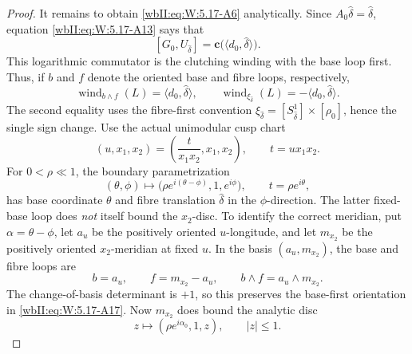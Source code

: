 \begin{proof}
It remains to obtain \eqref{wbII:eq:W:5.17-A6} analytically.  Since
\(A_0\widehat\delta=\widehat\delta\), equation \eqref{wbII:eq:W:5.17-A13} says that
\[
 [G_0,U_{\widehat\delta}]
 =\mathbf c\bigl(\langle d_0,\widehat\delta\rangle\bigr).
\tag{W.113}\label{wbII:eq:W:5.17-A16}
\]
This logarithmic commutator is the clutching winding with the base loop
first.  Thus, if \(b\) and \(f\) denote the oriented base and fibre loops,
respectively,
\[
 \operatorname{wind}_{b\wedge f}(L)
  =\langle d_0,\widehat\delta\rangle,
 \qquad
 \operatorname{wind}_{\xi_{\widehat\delta}}(L)
 =-\langle d_0,\widehat\delta\rangle.
\tag{W.114}\label{wbII:eq:W:5.17-A17}
\]
The second equality uses the fibre-first convention
\(\xi_{\widehat\delta}=[S^1_{\widehat\delta}]\times[\rho_0]\), hence the
single sign change.
Use the actual unimodular cusp chart
\[
 (u,x_1,x_2)=\left(\frac{t}{x_1x_2},x_1,x_2\right),
 \qquad t=ux_1x_2.
\tag{W.115}\label{wbII:eq:W:5.17-A18}
\]
For \(0<\rho\ll1\), the boundary parametrization
\[
 (\theta,\phi)\longmapsto
 \bigl(\rho e^{i(\theta-\phi)},1,e^{i\phi}\bigr),
 \qquad t=\rho e^{i\theta},
\tag{W.116}\label{wbII:eq:W:5.17-A19}
\]
has base coordinate \(\theta\) and fibre translation
\(\widehat\delta\) in the \(\phi\)-direction.  The latter fixed-base loop
does \emph{not} itself bound the \(x_2\)-disc.  To identify the correct
meridian, put \(\alpha=\theta-\phi\), let \(a_u\) be the positively
oriented \(u\)-longitude, and let \(m_{x_2}\) be the positively oriented
\(x_2\)-meridian at fixed \(u\).  In the basis
\((a_u,m_{x_2})\), the base and fibre loops are
\[
 b=a_u,
 \qquad
 f=m_{x_2}-a_u,
 \qquad
 b\wedge f=a_u\wedge m_{x_2}.
\tag{W.117}\label{wbII:eq:W:5.17-A19a}
\]
The change-of-basis determinant is \(+1\), so this preserves the
base-first orientation in \eqref{wbII:eq:W:5.17-A17}.  Now \(m_{x_2}\) does bound the
analytic disc
\[
 z\longmapsto(\rho e^{i\alpha_0},1,z),
 \qquad |z|\le1.
\tag{W.118}\label{wbII:eq:W:5.17-A19b}
\]


\end{proof}
